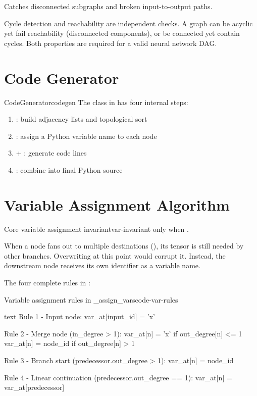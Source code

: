 \documentclass{nngraph-en}
\begin{document}
Catches disconnected subgraphs and broken input-to-output paths.

\begin{notebox}
Cycle detection and reachability are independent checks. A graph can
be acyclic yet fail reachability (disconnected components), or be
connected yet contain cycles. Both properties are required for a
valid neural network DAG.
\end{notebox}

\section{Code Generator}

\begin{dfnbox}{CodeGenerator}{codegen}
The  class in  has
four internal steps:
\begin{enumerate}[noitemsep]
    \item {}: build adjacency lists and
    topological sort
    \item {}: assign a Python variable name
    to each node
    \item {} + : generate
    code lines
    \item {}: combine into final Python source
\end{enumerate}
\end{dfnbox}

\section{Variable Assignment Algorithm}

\begin{dfnbox}{Core variable assignment invariant}{var-invariant}
 only when
.

When a node fans out to multiple destinations (),
its tensor is still needed by other branches. Overwriting 
at this point would corrupt it. Instead, the downstream node receives
its own identifier as a variable name.
\end{dfnbox}

The four complete rules in :

\begin{codebox}{Variable assignment rules in \_assign\_vars}{code-var-rules}
\begin{amzcode}{text}
Rule 1 - Input node:
    var_at[input_id] = 'x'

Rule 2 - Merge node (in_degree > 1):
    var_at[n] = 'x'       if out_degree[n] <= 1
    var_at[n] = node_id   if out_degree[n] > 1

Rule 3 - Branch start (predecessor.out_degree > 1):
    var_at[n] = node_id

Rule 4 - Linear continuation (predecessor.out_degree == 1):
    var_at[n] = var_at[predecessor]
\end{amzcode}
\end{codebox}
\end{document}
